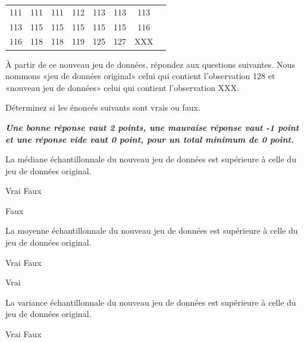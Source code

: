 \begin{questions}
\begin{parts}
\begin{center}
\begin{tabular}{  c c c c c c c c }
111  &111  &111  &112  &113  &113  &113 \\
113 &115  &115  &115  &115 &115 & 116 \\
116 & 118 & 118 & 119 & 125 &127 & XXX\\
\end{tabular}
\end{center}

À partir de ce nouveau jeu de données, répondez aux questions suivantes. Nous nommons «jeu de données original» celui qui contient l'observation 128 et «nouveau jeu de données» celui qui contient l'observation XXX.

Déterminez si les énoncés suivants sont vrais ou faux. 

\textbf{\textit{Une bonne réponse vaut 2 points, une mauvaise réponse vaut -1 point et une réponse vide vaut 0 point, pour un total minimum de 0 point.}}

\begin{subparts}
\subpart La médiane échantillonnale du nouveau jeu de données est supérieure à celle du jeu de données original.

    \begin{oneparcheckboxes}
        \choice Vrai
        \correctchoice Faux
    \end{oneparcheckboxes}
    
\begin{solution}
    Faux
\end{solution}

\subpart La moyenne échantillonnale du nouveau jeu de données est supérieure à celle du jeu de données original.

    \begin{oneparcheckboxes}
        \correctchoice Vrai
        \choice Faux
    \end{oneparcheckboxes}
    
\begin{solution}
    Vrai
\end{solution}

\subpart La variance échantillonnale du nouveau jeu de données est supérieure à celle du jeu de données original.

    \begin{oneparcheckboxes}
        \correctchoice Vrai
        \choice Faux
    \end{oneparcheckboxes}
    

\end{subparts}
\end{parts}
\end{questions}
